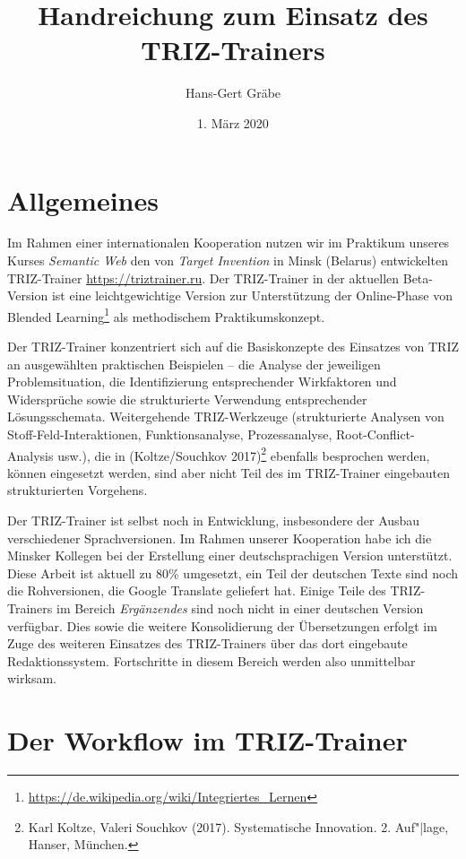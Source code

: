 \documentclass[11pt,a4paper]{article}
\title{Handreichung zum Einsatz des TRIZ-Trainers}
\author{Hans-Gert Gr\"abe}
\date{1. März 2020}
\begin{document}
\maketitle
\tableofcontents

\section{Allgemeines}

Im Rahmen einer internationalen Kooperation nutzen wir im Praktikum unseres
Kurses \emph{Semantic Web} den von \emph{Target Invention} in Minsk (Belarus)
entwickelten TRIZ-Trainer \url{https://triztrainer.ru}.  Der TRIZ-Trainer in
der aktuellen Beta-Version ist eine leichtgewichtige Version zur Unterstützung
der Online-Phase von Blended
Learning\footnote{\url{https://de.wikipedia.org/wiki/Integriertes_Lernen}} als
methodischem Praktikumskonzept.

Der TRIZ-Trainer konzentriert sich auf die Basiskonzepte des Einsatzes von
TRIZ an ausgewählten praktischen Beispielen -- die Analyse der jeweiligen
Problemsituation, die Identifizierung entsprechender Wirkfaktoren und
Widersprüche sowie die strukturierte Verwendung entsprechender
Lösungsschemata.  Weitergehende TRIZ-Werkzeuge (strukturierte Analysen von
Stoff-Feld-Interaktionen, Funktionsanalyse, Prozessanalyse,
Root-Conflict-Analysis usw.), die in (Koltze/Souchkov 2017)\footnote{Karl
  Koltze, Valeri Souchkov (2017). Systematische Innovation.  2. Auf"|lage,
  Hanser, München.} ebenfalls besprochen werden, können eingesetzt werden,
sind aber nicht Teil des im TRIZ-Trainer eingebauten strukturierten Vorgehens.

Der TRIZ-Trainer ist selbst noch in Entwicklung, insbesondere der Ausbau
verschiedener Sprachversionen.  Im Rahmen unserer Kooperation habe ich die
Minsker Kollegen bei der Erstellung einer deutschsprachigen Version
unterstützt.  Diese Arbeit ist aktuell zu 80\% umgesetzt, ein Teil der
deutschen Texte sind noch die Rohversionen, die Google Translate geliefert
hat.  Einige Teile des TRIZ-Trainers im Bereich \emph{Ergänzendes} sind noch
nicht in einer deutschen Version verfügbar. Dies sowie die weitere
Konsolidierung der Übersetzungen erfolgt im Zuge des weiteren Einsatzes des
TRIZ-Trainers über das dort eingebaute Redaktionssystem.  Fortschritte in
diesem Bereich werden also unmittelbar wirksam.

\section{Der Workflow im TRIZ-Trainer}
\end{document}

